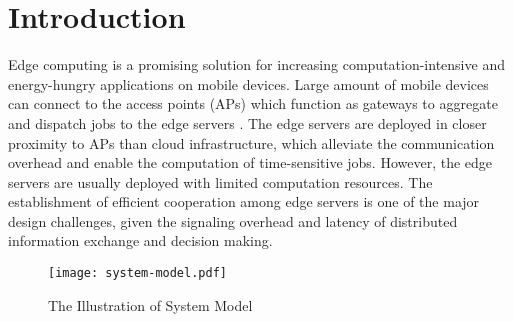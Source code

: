 \section{Introduction}
\label{sec:introduction}
Edge computing is a promising solution for increasing computation-intensive and energy-hungry applications on mobile devices.
Large amount of mobile devices can connect to the access points (APs) which function as gateways to aggregate and dispatch jobs to the edge servers \cite{MEC-SURVEY}.
The edge servers are deployed in closer proximity to APs than cloud infrastructure, which alleviate the communication overhead and enable the computation of time-sensitive jobs.
However, the edge servers are usually deployed with limited computation resources.
The establishment of efficient cooperation among edge servers is one of the major design challenges, given the signaling overhead and latency of distributed information exchange and decision making.

\begin{figure}[htp!]
    \centering
    \texttt{[image: system-model.pdf]}
    \caption{The Illustration of System Model}
    \label{fig:system}
\end{figure}

